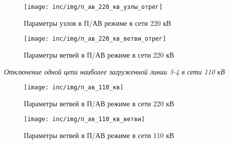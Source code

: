 \begin{figure}[ht]
	\centering
	\texttt{[image: inc/img/п\_ав\_220\_кв\_узлы\_отрег]}
	\caption{Параметры узлов в П/АВ режиме в сети 220 кВ}
	\label{fig:п/ав_в_сети_220_кв_узлы}
\end{figure}

\begin{figure}[ht]
	\centering
	\texttt{[image: inc/img/п\_ав\_220\_кв\_ветви\_отрег]}
	\caption{Параметры ветвей в П/АВ режиме в сети 220 кВ}
	\label{fig:п/ав_в_сети_220_кв_ветви}
\end{figure}

\textit{Отключение одной цепи наиболее загруженной линии 3-4 в сети 110 кВ}

\begin{figure}[ht]
	\centering
	\texttt{[image: inc/img/п\_ав\_110\_кв]}
	\caption{Параметры ветвей в П/АВ режиме в сети 220 кВ}
	\label{fig:п/ав_в_сети_110_кв_узлы}
\end{figure}

\begin{figure}[ht]
	\centering
	\texttt{[image: inc/img/п\_ав\_110\_кв\_ветви]}
	\caption{Параметры ветвей в П/АВ режиме в сети 110 кВ}
	\label{fig:п/ав_в_сети_110_кв_ветви}
\end{figure}
